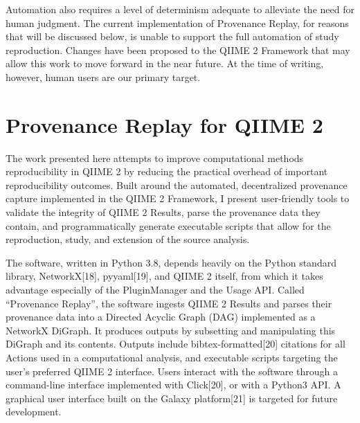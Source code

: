 Automation also requires a level of determinism adequate to alleviate the need
for human judgment. The current implementation of Provenance Replay, for reasons
that will be discussed below, is unable to support the full automation of study
reproduction. Changes have been proposed to the QIIME 2 Framework that may allow
this work to move forward in the near future. At the time of writing, however,
human users are our primary target.


\section{Provenance Replay for QIIME 2}

The work presented here attempts to improve computational methods
reproducibility in QIIME 2 by reducing the practical overhead of important
reproducibility outcomes. Built around the automated, decentralized provenance
capture implemented in the QIIME 2 Framework, I present user-friendly tools to
validate the integrity of QIIME 2 Results, parse the provenance data they
contain, and programmatically generate executable scripts that allow for the
reproduction, study, and extension of the source analysis.

The software, written in Python 3.8, depends heavily on the Python standard
library, NetworkX[18], pyyaml[19], and QIIME 2 itself, from which it takes
advantage especially of the PluginManager and the Usage API. Called “Provenance
Replay”, the software ingests QIIME 2 Results and parses their provenance data
into a Directed Acyclic Graph (DAG) implemented as a NetworkX DiGraph. It
produces outputs by subsetting and manipulating this DiGraph and its contents.
Outputs include bibtex-formatted[20] citations for all Actions used in a
computational analysis, and executable scripts targeting the user’s preferred
QIIME 2 interface. Users interact with the software through a command-line
interface implemented with Click[20], or with a Python3 API. A graphical user
interface built on the Galaxy platform[21] is targeted for future development.
